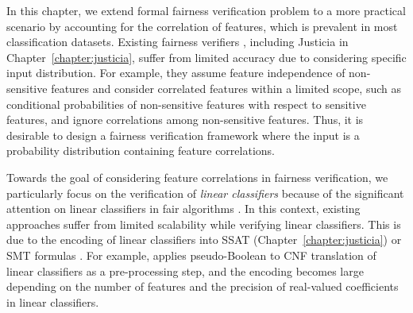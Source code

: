	In this chapter, we extend formal fairness verification problem to a more practical scenario by accounting for the correlation of features, which is prevalent in most classification datasets. Existing fairness verifiers \cite{albarghouthi2017fairsquare,bastani2019probabilistic}, including Justicia in Chapter~\ref{chapter:justicia}, suffer from limited accuracy due to considering specific input distribution. For example, they assume feature independence of non-sensitive features and consider correlated features within a limited scope, such as conditional probabilities of non-sensitive features with respect to sensitive features, and ignore correlations among non-sensitive features. Thus, it is desirable to design a fairness verification framework where the input is a probability distribution containing feature correlations.
	
	Towards the goal of considering feature correlations in fairness verification, we particularly focus on the verification of \textit{linear classifiers} because of the significant attention on linear classifiers in fair algorithms \cite{pleiss2017fairness,zafar2017fairness,dressel2018accuracy, john2020verifying}. In this context, existing approaches suffer from limited scalability while verifying linear classifiers. This is due to the encoding of linear classifiers into SSAT (Chapter~\ref{chapter:justicia}) or SMT formulas \cite{albarghouthi2017fairsquare}. For example, {\justicia} applies pseudo-Boolean to CNF translation of linear classifiers as a pre-processing step, and the encoding becomes large depending on the number of features and the precision of real-valued coefficients in linear classifiers.
	
